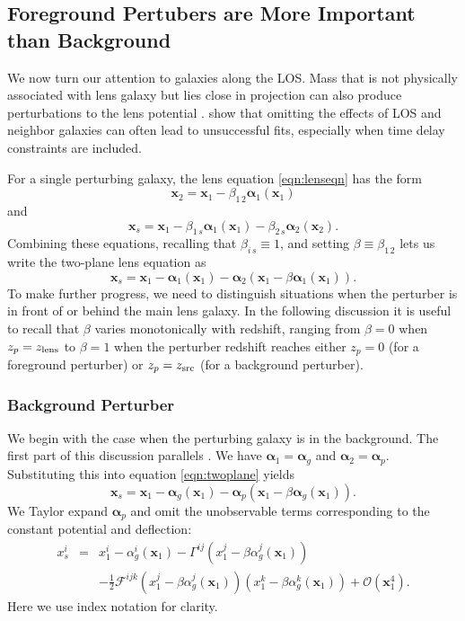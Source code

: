 \documentclass{emulateapj}
\newcommand\x[0]{\mathbf{x}}
\newcommand\al[0]{\boldsymbol{\alpha}}
\newcommand\sF{{\mathcal F}}
\begin{document}
\subsection{Foreground Pertubers are More Important than Background}

We now turn our attention to galaxies along the LOS. Mass that is not physically associated with lens galaxy but lies close in projection can also produce perturbations to the lens potential \citep[e.g.,][]{Bar-Kana96,Momcheva06,Wong11}. \citet{Jaroszynski14} show that omitting the effects of LOS and neighbor galaxies can often lead to unsuccessful fits, especially when time delay constraints are included.

For a single perturbing galaxy, the lens equation \ref{eqn:lenseqn} has the form
\begin{equation}
\x_2 = \x_1 - \beta_{1\,2} \al_1(\x_1)
\end{equation}
and
\begin{equation}
\x_s = \x_1 - \beta_{1\,s} \al_1(\x_1) - \beta_{2\,s} \al_2(\x_2).
\end{equation}
Combining these equations, recalling that $\beta_{i\,s} \equiv 1$, and setting $\beta \equiv \beta_{1\,2}$ lets us write the two-plane lens equation as
\begin{equation}
\x_s = \x_1 - \al_1(\x_1) - \al_2\left(\x_1 - \beta \al_1(\x_1)\right).
\label{eqn:twoplane}
\end{equation}
To make further progress, we need to distinguish situations when the perturber is in front of or behind the main lens galaxy.  In the following discussion it is useful to recall that $\beta$ varies monotonically with redshift, ranging from $\beta = 0$ when $z_p = z_{\rm{lens}}$ to $\beta = 1$ when the perturber redshift reaches either $z_p = 0$ (for a foreground perturber) or $z_p = z_{\rm{src}}$ (for a background perturber).

\subsubsection{Background Perturber}
\label{sec:background}

We begin with the case when the perturbing galaxy is in the background. The first part of this discussion parallels \citet{Keeton03}.  We have $\al_1 = \al_g$ and $\al_2 = \al_p$. Substituting this into equation \ref{eqn:twoplane} yields
\begin{equation}
\x_s = \x_1 - \al_g(\x_1) - \al_p(\x_1 - \beta \al_g(\x_1)). 
\end{equation}
We Taylor expand $\al_p$ and omit the unobservable terms corresponding to the constant potential and deflection:
\begin{eqnarray}
x^i_s &=& x^i_1 - \alpha^i_g(\x_1) - \Gamma^{ij} (x^j_1 - \beta \alpha^j_g(\x_1)) \\
&&- \frac{1}{2} \sF^{ijk} (x^j_1 - \beta \alpha^j_g(\x_1)) (x^k_1 - \beta \alpha^k_g(\x_1)) + \mathcal{O}(\x_1^4) . \nonumber
\end{eqnarray}
Here we use index notation for clarity.
\end{document}
